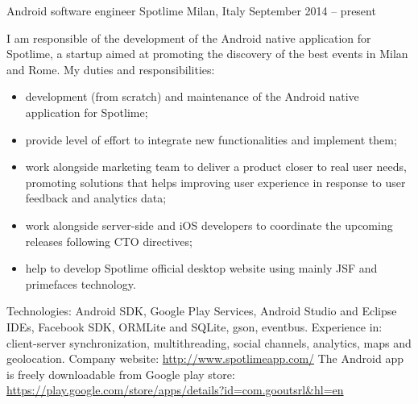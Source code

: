 \begin{cventries}
\cventry
{Android software engineer}
{Spotlime}
{Milan, Italy}
{September 2014 -- present}
{
   I am responsible of the 
   development of the 
   Android native application for 
   Spotlime, a startup aimed  at promoting  the 
   discovery of the best events in Milan and Rome. 
   My duties and responsibilities:
   \begin{itemize}
      \item development (from scratch) and maintenance of the Android native application
	 for Spotlime;
      \item provide level of effort to integrate new functionalities and
	 implement them;
      \item 
   work alongside marketing team to deliver a product closer
   to real user
   needs, promoting solutions that helps improving user experience in response
   to user feedback and analytics data;
      \item 
   work alongside server-side and iOS developers to coordinate the upcoming
   releases following CTO directives;
\item help to develop Spotlime official desktop website using mainly JSF and
   primefaces technology.
\end{itemize}
   Technologies:
   Android SDK, Google Play Services,
   Android Studio and Eclipse IDEs, Facebook SDK, 
   ORMLite and SQLite, gson,  eventbus.
   Experience in: client-server synchronization,  multithreading, 
   social channels,
   analytics, maps and geolocation. 
   Company website:
   \url{http://www.spotlimeapp.com/}
   The Android app is freely downloadable from Google play store: 
   \url{https://play.google.com/store/apps/details?id=com.gooutsrl&hl=en}
}


\end{cventries}
